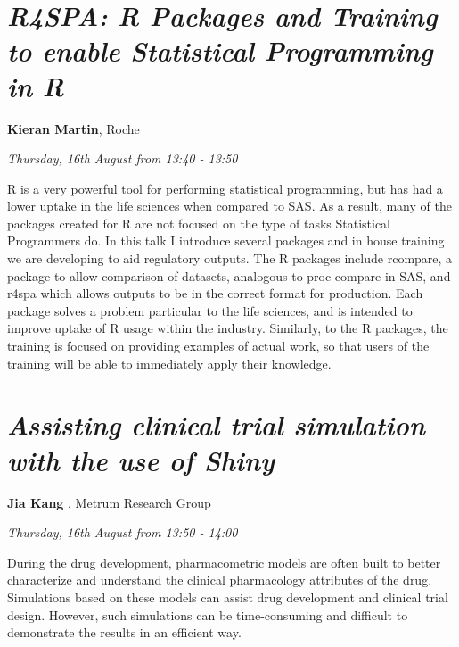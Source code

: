 \documentclass[]{book}
\theoremstyle{definition}
\theoremstyle{definition}
\theoremstyle{definition}
\theoremstyle{remark}
\begin{document}
\hypertarget{r4spa-r-packages-and-training-to-enable-statistical-programming-in-r-1}{%
\section{\texorpdfstring{\emph{R4SPA: R Packages and Training to enable
Statistical Programming in
R}}{R4SPA: R Packages and Training to enable Statistical Programming in R}}\label{r4spa-r-packages-and-training-to-enable-statistical-programming-in-r-1}}

\textbf{Kieran Martin}, Roche

\emph{Thursday, 16th August from 13:40 - 13:50}

R is a very powerful tool for performing statistical programming, but
has had a lower uptake in the life sciences when compared to SAS. As a
result, many of the packages created for R are not focused on the type
of tasks Statistical Programmers do. In this talk I introduce several
packages and in house training we are developing to aid regulatory
outputs. The R packages include rcompare, a package to allow comparison
of datasets, analogous to proc compare in SAS, and r4spa which allows
outputs to be in the correct format for production. Each package solves
a problem particular to the life sciences, and is intended to improve
uptake of R usage within the industry. Similarly, to the R packages, the
training is focused on providing examples of actual work, so that users
of the training will be able to immediately apply their knowledge.

\hypertarget{assisting-clinical-trial-simulation-with-the-use-of-shiny-1}{%
\section{\texorpdfstring{\emph{Assisting clinical trial simulation with
the use of
Shiny}}{Assisting clinical trial simulation with the use of Shiny}}\label{assisting-clinical-trial-simulation-with-the-use-of-shiny-1}}

\textbf{Jia Kang }, Metrum Research Group

\emph{Thursday, 16th August from 13:50 - 14:00}

During the drug development, pharmacometric models are often built to
better characterize and understand the clinical pharmacology attributes
of the drug. Simulations based on these models can assist drug
development and clinical trial design. However, such simulations can be
time-consuming and difficult to demonstrate the results in an efficient
way.
\end{document}
